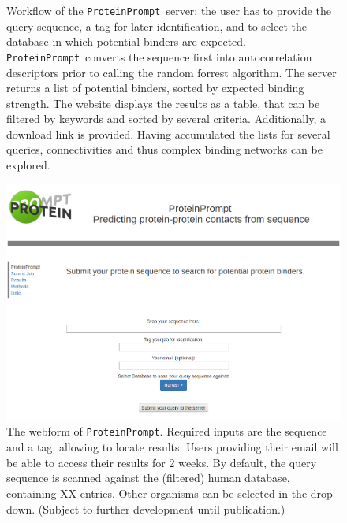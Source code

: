 \documentclass{article}
\newcommand{\tool}{\texttt{ProteinPrompt}}
\begin{document}
\begin{figure}
  
  \caption{Workflow of the \tool\  server: the user has to provide the query sequence, a tag for later identification, and to select the database in which potential binders are expected. \tool\  converts the sequence first into autocorrelation descriptors prior to calling the random forrest algorithm. The server returns a list of potential binders, sorted by expected binding strength. The website displays the results as a table, that can be filtered by keywords and sorted by several criteria. Additionally, a download link is provided. Having accumulated the lists for several queries, connectivities and thus complex binding networks can be explored. }
\end{figure}

\begin{figure}
  \includegraphics[width=\linewidth]{material/webform.png}
  \caption{The webform of \tool.
    Required inputs are the sequence and a tag, allowing to locate results.
    Users providing their email will be able to access their results for 2 weeks.
    By default, the query sequence is scanned against the (filtered) human database, containing XX entries.
    Other organisms can be selected in the drop-down.
    (Subject to further development until publication.)}
\end{figure}






\end{document}
